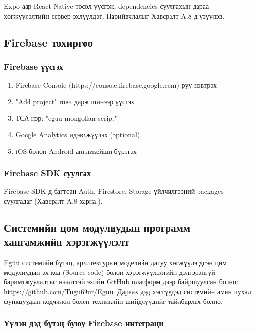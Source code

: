 Expo-аар React Native төсөл үүсгэж, dependencies суулгахын дараа хөгжүүлэлтийн сервер эхлүүлдэг. Нарийвчлалыг Хавсралт A.8-д үзүүлэв.

\subsection{Firebase тохиргоо}
\label{subsec:firebase-setup}

\subsubsection{Firebase үүсгэх}

\begin{enumerate}
    \item Firebase Console (https://console.firebase.google.com) руу нэвтрэх
    \item "Add project" товч дарж шинээр үүсгэх
    \item ТСА нэр: "eguu-mongolian-script"
    \item Google Analytics идэвхжүүлэх (optional)
    \item iOS болон Android аппликейшн бүртгэх
\end{enumerate}

\subsubsection{Firebase SDK суулгах}

Firebase SDK-д багтсан Auth, Firestore, Storage үйлчилгээний packages суулгадаг (Хавсралт A.8 харна.).

\subsection{Системийн цөм модулиудын программ хангамжийн хэрэгжүүлэлт}
\label{subsec:core-features}

Egüü системийн бүтэц, архитектурын моделийн дагуу хөгжүүлэгдсэн цөм модулиудын эх код (Source code) болон хэрэгжүүлэлтийн дэлгэрэнгүй баримтжуулалтыг нээлттэй эхийн GitHub платформ дээр байршуулсан болно: \url{https://github.com/Tugu69ur/Eguu}. Дараах дэд хэсгүүдэд системийн амин чухал функцуудын кодчилол болон техникийн шийдлүүдийг тайлбарлах болно.

\subsubsection{Үүлэн дэд бүтэц буюу Firebase интеграци}

